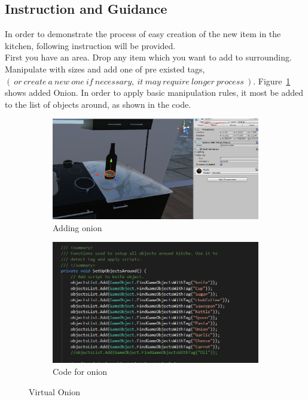 \documentclass[18pt]{article}
\numberwithin{equation}{section} %
\numberwithin{figure}{section} %
\numberwithin{table}{section} %
\begin{document}
	
	\subsection{Instruction and Guidance}	
		In order to demonstrate the process of easy creation of the new item in the kitchen, following instruction will be provided.\\
		
		First you have an area. Drop any item which you want to add to surrounding. Manipulate with sizes and add one of pre existed tags, $\left(\ or\ create\ a\ new\ one\ if\ necessary,\ it\ may\ require\ longer\ process\  \right) . $ Figure~\ref{fig:add_object} shows added Onion. In order to apply basic manipulation rules, it most be added to the list of objects around, as shown in the code. \\
		
		\begin{figure}[H]
			\centering
			\begin{subfigure}{0.45\textwidth}
				\centering
				\includegraphics[width=1\linewidth]{images/add_onion}
				\caption{Adding onion}
			\end{subfigure}
			\begin{subfigure}{0.45\textwidth}
				\centering
				\includegraphics[width=0.85\linewidth]{images/add_onion_code}
				\caption{Code for onion}
			\end{subfigure}		
			\caption{Virtual Onion}
			\label{fig:add_object}
		\end{figure}
		
\end{document}
